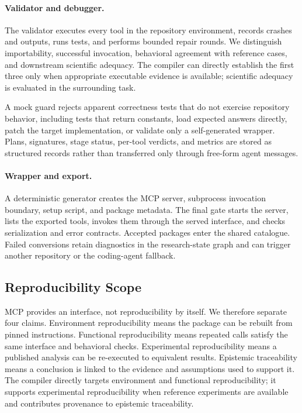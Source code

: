 \documentclass[letterpaper]{article} %
\begin{document}
\paragraph{Validator and debugger.}
The validator executes every tool in the repository environment, records crashes and outputs, runs tests, and performs bounded repair rounds. We distinguish importability, successful invocation, behavioral agreement with reference cases, and downstream scientific adequacy. The compiler can directly establish the first three only when appropriate executable evidence is available; scientific adequacy is evaluated in the surrounding task.

A mock guard rejects apparent correctness tests that do not exercise repository behavior, including tests that return constants, load expected answers directly, patch the target implementation, or validate only a self-generated wrapper. Plans, signatures, stage status, per-tool verdicts, and metrics are stored as structured records rather than transferred only through free-form agent messages.

\paragraph{Wrapper and export.}
A deterministic generator creates the MCP server, subprocess invocation boundary, setup script, and package metadata. The final gate starts the server, lists the exported tools, invokes them through the served interface, and checks serialization and error contracts. Accepted packages enter the shared catalogue. Failed conversions retain diagnostics in the research-state graph and can trigger another repository or the coding-agent fallback.

\subsection{Reproducibility Scope}

MCP provides an interface, not reproducibility by itself. We therefore separate four claims. Environment reproducibility means the package can be rebuilt from pinned instructions. Functional reproducibility means repeated calls satisfy the same interface and behavioral checks. Experimental reproducibility means a published analysis can be re-executed to equivalent results. Epistemic traceability means a conclusion is linked to the evidence and assumptions used to support it. The compiler directly targets environment and functional reproducibility; it supports experimental reproducibility when reference experiments are available and contributes provenance to epistemic traceability.
\end{document}
